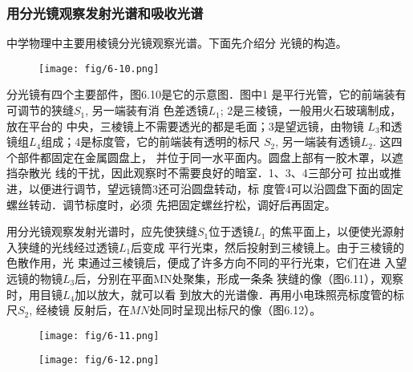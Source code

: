 \subsubsection{用分光镜观察发射光谱和吸收光谱}
中学物理中主要用棱镜分光镜观察光谱。下面先介绍分
光镜的构造。

\begin{figure}[htp]
    \centering
\texttt{[image: fig/6-10.png]}
    \caption{}
\end{figure}

分光镜有四个主要部件，图6.10是它的示意图．图中1
是平行光管，它的前端装有可调节的狭缝$S_1$, 另一端装有消
色差透镜$L_1$; 2是三棱镜，一般用火石玻璃制成，放在平台的
中央，三棱镜上不需要透光的都是毛面；3是望远镜，由物镜
$L_3$和透镜组$L_4$组成；4是标度管，它的前端装有透明的标尺
$S_2$, 另一端装有透镜$L_2$. 这四个部件都固定在金属圆盘上，
并位于同一水平面内。圆盘上部有一胶木罩，以遮挡杂散光
线的干扰，因此观察时不需要良好的暗室．1、3、4三部分可
拉出或推进，以便进行调节，望远镜筒3还可沿圆盘转动，标
度管4可以沿圆盘下面的固定螺丝转动．调节标度时，必须
先把固定螺丝拧松，调好后再固定。

用分光镜观察发射光谱时，应先使狭缝$S_1$位于透镜$L_1$
的焦平面上，以便使光源射入狭缝的光线经过透镜$L_1$后变成
平行光束，然后投射到三棱镜上。由于三棱镜的色散作用，光
束通过三棱镜后，便成了许多方向不同的平行光束，它们在进
入望远镜的物镜$L_3$后，分别在平面MN处聚集，形成一条条
狭缝的像（图6.11），观察时，用目镜$L_4$加以放大，就可以看
到放大的光谱像．再用小电珠照亮标度管的标尺$S_2$, 经棱镜
反射后，在$MN$处同时呈现出标尺的像（图6.12）。

\begin{figure}[htp]\centering
    \begin{minipage}[t]{0.48\textwidth}
    \centering
\texttt{[image: fig/6-11.png]}
    \caption{}
    \end{minipage}
    \begin{minipage}[t]{0.48\textwidth}
    \centering
\texttt{[image: fig/6-12.png]}
    \caption{}
    \end{minipage}
    \end{figure}

